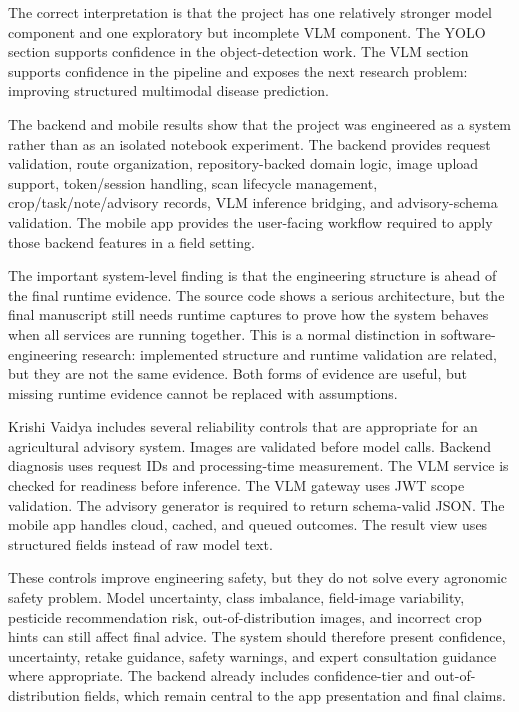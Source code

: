 The correct interpretation is that the project has one relatively stronger model component and
one exploratory but incomplete VLM component. The YOLO section supports confidence in the
object-detection work. The VLM section supports confidence in the pipeline and exposes the next
research problem: improving structured multimodal disease prediction.


The backend and mobile results show that the project was engineered as a system rather than as an
isolated notebook experiment. The backend provides request validation, route organization,
repository-backed domain logic, image upload support, token/session handling, scan lifecycle
management, crop/task/note/advisory records, VLM inference bridging, and advisory-schema
validation. The mobile app provides the user-facing workflow required to apply those backend
features in a field setting.

The important system-level finding is that the engineering structure is ahead of the final runtime
evidence. The source code shows a serious architecture, but the final manuscript still needs
runtime captures to prove how the system behaves when all services are running together. This is a
normal distinction in software-engineering research: implemented structure and runtime validation
are related, but they are not the same evidence. Both forms of evidence are useful, but missing
runtime evidence cannot be replaced with assumptions.


Krishi Vaidya includes several reliability controls that are appropriate for an agricultural
advisory system. Images are validated before model calls. Backend diagnosis uses request IDs and
processing-time measurement. The VLM service is checked for readiness before inference. The VLM
gateway uses JWT scope validation. The advisory generator is required to return schema-valid JSON.
The mobile app handles cloud, cached, and queued outcomes. The result view uses structured fields
instead of raw model text.

These controls improve engineering safety, but they do not solve every agronomic safety problem.
Model uncertainty, class imbalance, field-image variability, pesticide recommendation risk,
out-of-distribution images, and incorrect crop hints can still affect final advice. The system
should therefore present confidence, uncertainty, retake guidance, safety warnings, and expert
consultation guidance where appropriate. The backend already includes confidence-tier and
out-of-distribution fields, which remain central to the app presentation and final claims.

